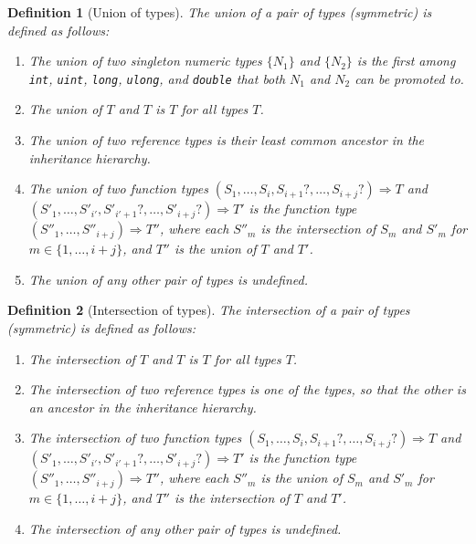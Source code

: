 \makeatletter{}\documentclass[10pt,oneside]{book}
\theoremstyle{note}
\newtheorem{definition}{Definition}[section]
\begin{document}
\begin{definition}[Union of types]
The union of a pair of types (symmetric) is defined as follows:

\begin{enumerate}
\item The union of two singleton numeric types $\{N_1\}$ and $\{N_2\}$
  is the first among {\tt int}, {\tt uint}, {\tt long}, {\tt ulong}, and {\tt double} that
    both $N_1$ and $N_2$ can be promoted to.

\item The union of $T$ and $T$ is $T$ for all types $T$.

\item The union of two reference types is their least common ancestor
  in the inheritance hierarchy.

\item The union of two function types $(S_1,\dots,S_i,S_{i+1}?,\dots,S_{i+j}?) \Rightarrow T$ and
  $(S'_1,\dots,S'_{i'},S'_{i'+1}?,\dots,S'_{i+j}?) \Rightarrow T'$  is the function type
  $(S''_1,\dots,S''_{i+j})
  \Rightarrow T''$, where each $S''_m$ is the
  intersection of $S_m$ and $S'_m$ for $m \in \{1,\dots,i+j\}$, and $T''$ is the
  union of $T$ and $T'$.

\item The union of any other pair of types is undefined.
\end{enumerate}
\end{definition}

\begin{definition}[Intersection of types]
The intersection of a pair of types (symmetric) is defined as follows:

\begin{enumerate}
\item The intersection of $T$ and $T$ is $T$ for all types $T$.

\item The intersection of two reference types is one of the types, so
  that the other is an ancestor in the inheritance hierarchy.

\item The intersection of two function types $(S_1,\dots,S_i,S_{i+1}?,\dots,S_{i+j}?) \Rightarrow T$ and
  $(S'_1,\dots,S'_{i'},S'_{i'+1}?,\dots,S'_{i+j}?) \Rightarrow T'$  is the function type
  $(S''_1,\dots,S''_{i+j})
  \Rightarrow T''$, where each $S''_m$ is the
  union of $S_m$ and $S'_m$ for $m \in \{1,\dots,i+j\}$, and $T''$ is the
  intersection of $T$ and $T'$.

\item The intersection of any other pair of types is undefined.
\end{enumerate}
\end{definition}
\end{document}
